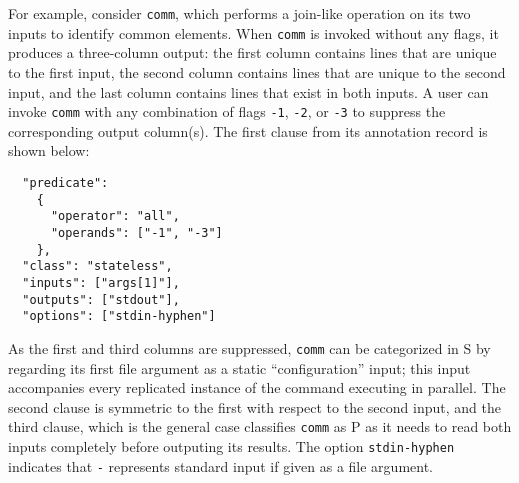 \documentclass[sigplan, review, screen, anonymous]{acmart}
\newcommand{\ie}{{\em i.e.}, }
\newcommand{\ttt}[1]{\texttt{#1}}
\newcommand{\cn}[1]{\mbox{\textcircled{\footnotesize #1}}}
\newcommand{\sta}{\cn{\textsc{S}}\xspace}
\newcommand{\pur}{\cn{\textsc{P}}\xspace}
\begin{document}
For example, consider \ttt{comm}, which performs a join-like operation on its two inputs to identify common elements.
When \ttt{comm} is invoked without any flags, it produces a three-column output:
  the first column contains lines that are unique to the first input, the second column contains lines that are unique to the second input, and the last column contains lines that exist in both inputs.
A user can invoke \ttt{comm} with any combination of flags \ttt{-1}, \ttt{-2}, or \ttt{-3} to suppress the corresponding output column(s).
The first clause from its annotation record is shown below:
%
\begin{verbatim}
  "predicate":
    { 
      "operator": "all",
      "operands": ["-1", "-3"] 
    },    
  "class": "stateless",
  "inputs": ["args[1]"],
  "outputs": ["stdout"],
  "options": ["stdin-hyphen"]
\end{verbatim}

\noindent
As the first and third columns are suppressed, \ttt{comm} can be categorized in \sta by regarding its first file argument as a static ``configuration'' input;
  this input accompanies every replicated instance of the command executing in parallel. The second clause is symmetric to the first with respect to the second input, and the third clause, which is the general case classifies \ttt{comm} as \pur as it needs to read both inputs completely before outputing its results. The option \ttt{stdin-hyphen} indicates that \ttt{-} represents standard input if given as a file argument.
\end{document}
